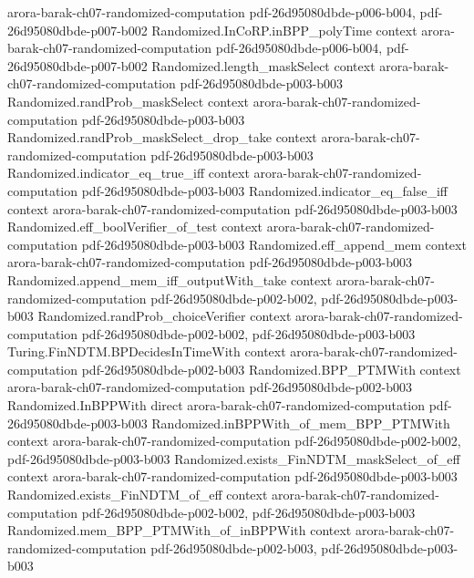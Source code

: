 \begin{theorem}
  {arora-barak-ch07-randomized-computation}
  {pdf-26d95080dbde-p006-b004,
    pdf-26d95080dbde-p007-b002}
\proofstep
  {Randomized.InCoRP.inBPP_polyTime}
  {context}
  {arora-barak-ch07-randomized-computation}
  {pdf-26d95080dbde-p006-b004,
    pdf-26d95080dbde-p007-b002}
\proofstep
  {Randomized.length_maskSelect}
  {context}
  {arora-barak-ch07-randomized-computation}
  {pdf-26d95080dbde-p003-b003}
\proofstep
  {Randomized.randProb_maskSelect}
  {context}
  {arora-barak-ch07-randomized-computation}
  {pdf-26d95080dbde-p003-b003}
\proofstep
  {Randomized.randProb_maskSelect_drop_take}
  {context}
  {arora-barak-ch07-randomized-computation}
  {pdf-26d95080dbde-p003-b003}
\proofstep
  {Randomized.indicator_eq_true_iff}
  {context}
  {arora-barak-ch07-randomized-computation}
  {pdf-26d95080dbde-p003-b003}
\proofstep
  {Randomized.indicator_eq_false_iff}
  {context}
  {arora-barak-ch07-randomized-computation}
  {pdf-26d95080dbde-p003-b003}
\proofstep
  {Randomized.eff_boolVerifier_of_test}
  {context}
  {arora-barak-ch07-randomized-computation}
  {pdf-26d95080dbde-p003-b003}
\proofstep
  {Randomized.eff_append_mem}
  {context}
  {arora-barak-ch07-randomized-computation}
  {pdf-26d95080dbde-p003-b003}
\proofstep
  {Randomized.append_mem_iff_outputWith_take}
  {context}
  {arora-barak-ch07-randomized-computation}
  {pdf-26d95080dbde-p002-b002,
    pdf-26d95080dbde-p003-b003}
\proofstep
  {Randomized.randProb_choiceVerifier}
  {context}
  {arora-barak-ch07-randomized-computation}
  {pdf-26d95080dbde-p002-b002,
    pdf-26d95080dbde-p003-b003}
\proofstep
  {Turing.FinNDTM.BPDecidesInTimeWith}
  {context}
  {arora-barak-ch07-randomized-computation}
  {pdf-26d95080dbde-p002-b003}
\proofstep
  {Randomized.BPP_PTMWith}
  {context}
  {arora-barak-ch07-randomized-computation}
  {pdf-26d95080dbde-p002-b003}
\proofstep
  {Randomized.InBPPWith}
  {direct}
  {arora-barak-ch07-randomized-computation}
  {pdf-26d95080dbde-p003-b003}
\proofstep
  {Randomized.inBPPWith_of_mem_BPP_PTMWith}
  {context}
  {arora-barak-ch07-randomized-computation}
  {pdf-26d95080dbde-p002-b002,
    pdf-26d95080dbde-p003-b003}
\proofstep
  {Randomized.exists_FinNDTM_maskSelect_of_eff}
  {context}
  {arora-barak-ch07-randomized-computation}
  {pdf-26d95080dbde-p003-b003}
\proofstep
  {Randomized.exists_FinNDTM_of_eff}
  {context}
  {arora-barak-ch07-randomized-computation}
  {pdf-26d95080dbde-p002-b002,
    pdf-26d95080dbde-p003-b003}
\proofstep
  {Randomized.mem_BPP_PTMWith_of_inBPPWith}
  {context}
  {arora-barak-ch07-randomized-computation}
  {pdf-26d95080dbde-p002-b003,
    pdf-26d95080dbde-p003-b003}

\end{theorem}
